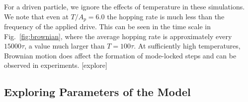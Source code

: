 \documentclass[twocolumn,preprintnumbers,amsmath,amssymb,aps,prx]{revtex4}
\begin{document}

  For a driven particle,
  we ignore 
  the effects of temperature 
  in these simulations.  
  We note that even at $T/A_p = 6.0$ 
  the hopping rate
  is much less than the
  frequency of the applied drive.
  This can be seen in the time scale in Fig.~\ref{fig:brownian},
  where the average hopping rate is approximately
  every $15000\tau$,
  a value much larger than $T = 100\tau$.
  At sufficiently high temperatures,
  Brownian motion does affect 
  the formation of mode-locked steps
  and can be observed in experiments.
  [explore]

  \subsection{Exploring Parameters of the Model}
  \label{ex:parameters}
\end{document}

